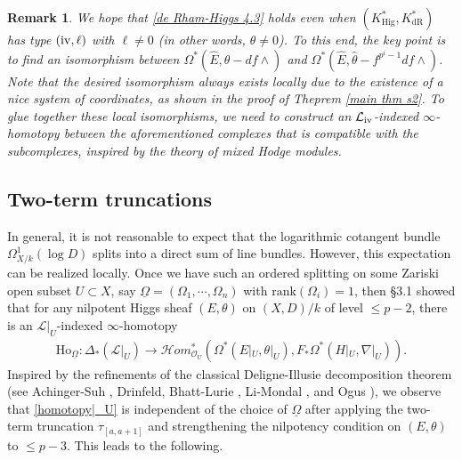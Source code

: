 \documentclass[12pt, a4paper]{article}
\newtheorem{remark}{Remark}[section]
\begin{document}
\begin{remark}
    We hope that \eqref{de Rham-Higgs 4.3} holds even when \( (K^*_{\mathrm{Hig}}, K^*_{\mathrm{dR}}) \) has type \( (\mathrm{\uppercase\expandafter{\romannumeral4}}, \ell) \) with \( \ell \neq 0 \) (in other words, \( \theta \neq 0 \)). To this end, the key point is to find an isomorphism between \( \Omega^*(\hat E, \hat\theta - df \wedge) \) and \( \Omega^*(\hat E, \hat\theta - f^{p^i - 1} df \wedge) \). Note that the desired isomorphism always exists locally due to the existence of a nice system of coordinates, as shown in the proof of Theprem \ref{main thm s2}. To glue together these local isomorphisms, we need to construct an \( \mathcal{L}_\mathrm{\uppercase\expandafter{\romannumeral4}} \)-indexed \( \infty \)-homotopy between the aforementioned complexes that is compatible with the subcomplexes, inspired by the theory of mixed Hodge modules.
\end{remark}




\subsection{Two-term truncations}

In general, it is not reasonable to expect that the logarithmic cotangent bundle $\Omega^1_{X/k}(\log D)$ splits into a direct sum of line bundles. However, this expectation can be realized locally. Once we have such an ordered splitting on some Zariski open subset $U\subset X$, say $\underline\Omega=(\Omega_1,\cdots,\Omega_n)$ with $\mathrm{rank}(\Omega_i)=1$, then \S3.1 showed that for any nilpotent Higgs sheaf $(E,\theta)$ on $(X,D)/k$ of level $\leq p-2$, there is an $\mathcal L|_U$-indexed $\infty$-homotopy
\begin{eqnarray}\label{homotopy|_U}
\mathrm{Ho}_{\underline{\Omega}}:\Delta_*(\mathcal L|_U)\to\mathcal Hom_{\mathcal O_U}^*(\Omega^*(E|_U,\theta|_U),F_*\Omega^*(H|_U,\nabla|_U)).
\end{eqnarray}
Inspired by the refinements of the classical Deligne-Illusie decomposition theorem (see Achinger-Suh \cite{AS}, Drinfeld, Bhatt-Lurie \cite{BL}, Li-Mondal \cite{LM}, and Ogus \cite{O24}), we observe that \eqref{homotopy|_U} is independent of the choice of \( \underline\Omega \) after applying the two-term truncation \( \tau_{[a, a+1]} \) and strengthening the nilpotency condition on \( (E, \theta) \) to \( \leq p-3 \). This leads to the following.
\end{document}
